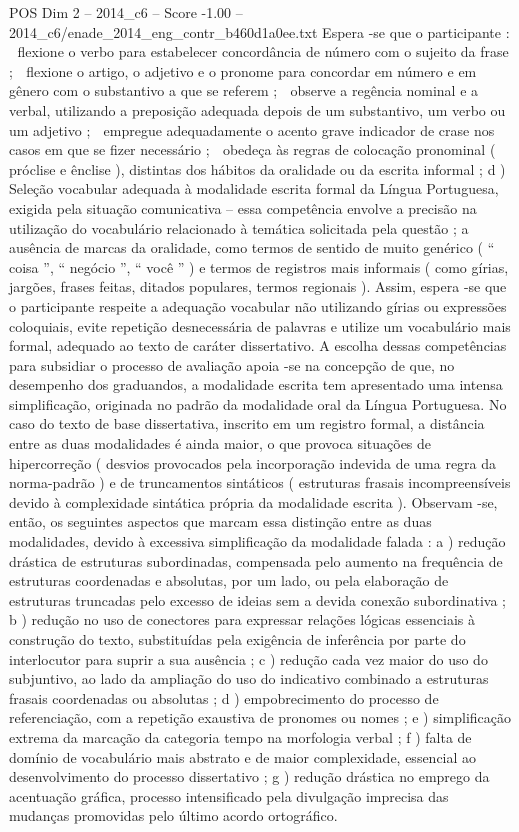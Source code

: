 \begin{textsample}{POS Dim 2 – 2014\_c6 – Score -1.00 – 2014\_c6/enade\_2014\_eng\_contr\_b460d1a0ee.txt}
Espera -se que o participante :  flexione o verbo para estabelecer concordância de número com o sujeito da frase ;  flexione o artigo, o adjetivo e o pronome para concordar em número e em gênero com o substantivo a que se referem ;  observe a regência nominal e a verbal, utilizando a preposição adequada depois de um substantivo, um verbo ou um adjetivo ;  empregue adequadamente o acento grave indicador de crase nos casos em que se fizer necessário ;  obedeça às regras de colocação pronominal ( próclise e ênclise ), distintas dos hábitos da oralidade ou da escrita informal ; d ) Seleção vocabular adequada à modalidade escrita formal da Língua Portuguesa, exigida pela situação comunicativa – essa competência envolve a precisão na utilização do vocabulário relacionado à temática solicitada pela questão ; a ausência de marcas da oralidade, como termos de sentido de muito genérico ( “ coisa ”, “ negócio ”, “ você ” ) e termos de registros mais informais ( como gírias, jargões, frases feitas, ditados populares, termos regionais ).
Assim, espera -se que o participante respeite a adequação vocabular não utilizando gírias ou expressões coloquiais, evite repetição desnecessária de palavras e utilize um vocabulário mais formal, adequado ao texto de caráter dissertativo.
A escolha dessas competências para subsidiar o processo de avaliação apoia -se na concepção de que, no desempenho dos graduandos, a modalidade escrita tem apresentado uma intensa simplificação, originada no padrão da modalidade oral da Língua Portuguesa.
No caso do texto de base dissertativa, inscrito em um registro formal, a distância entre as duas modalidades é ainda maior, o que provoca situações de hipercorreção ( desvios provocados pela incorporação indevida de uma regra da norma-padrão ) e de truncamentos sintáticos ( estruturas frasais incompreensíveis devido à complexidade sintática própria da modalidade escrita ).
Observam -se, então, os seguintes aspectos que marcam essa distinção entre as duas modalidades, devido à excessiva simplificação da modalidade falada : a ) redução drástica de estruturas subordinadas, compensada pelo aumento na frequência de estruturas coordenadas e absolutas, por um lado, ou pela elaboração de estruturas truncadas pelo excesso de ideias sem a devida conexão subordinativa ; b ) redução no uso de conectores para expressar relações lógicas essenciais à construção do texto, substituídas pela exigência de inferência por parte do interlocutor para suprir a sua ausência ; c ) redução cada vez maior do uso do subjuntivo, ao lado da ampliação do uso do indicativo combinado a estruturas frasais coordenadas ou absolutas ; d ) empobrecimento do processo de referenciação, com a repetição exaustiva de pronomes ou nomes ; e ) simplificação extrema da marcação da categoria tempo na morfologia verbal ; f ) falta de domínio de vocabulário mais abstrato e de maior complexidade, essencial ao desenvolvimento do processo dissertativo ; g ) redução drástica no emprego da acentuação gráfica, processo intensificado pela divulgação imprecisa das mudanças promovidas pelo último acordo ortográfico.

\end{textsample}
